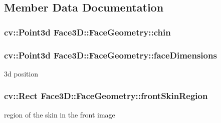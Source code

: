 \subsection{Member Data Documentation}
\subsubsection[{\texorpdfstring{chin}{chin}}]{\setlength{\rightskip}{0pt plus 5cm}cv\+::\+Point3d Face3\+D\+::\+Face\+Geometry\+::chin\hspace{0.3cm}{\ttfamily [private]}}\hypertarget{class_face3_d_1_1_face_geometry_a1c10c36a6624d30328d54b28f2829ac0}{}\label{class_face3_d_1_1_face_geometry_a1c10c36a6624d30328d54b28f2829ac0}
\subsubsection[{\texorpdfstring{face\+Dimensions}{faceDimensions}}]{\setlength{\rightskip}{0pt plus 5cm}cv\+::\+Point3d Face3\+D\+::\+Face\+Geometry\+::face\+Dimensions\hspace{0.3cm}{\ttfamily [private]}}\hypertarget{class_face3_d_1_1_face_geometry_a41a5f4561198a1296a9d37ad7f562c68}{}\label{class_face3_d_1_1_face_geometry_a41a5f4561198a1296a9d37ad7f562c68}


3d position 

\subsubsection[{\texorpdfstring{front\+Skin\+Region}{frontSkinRegion}}]{\setlength{\rightskip}{0pt plus 5cm}cv\+::\+Rect Face3\+D\+::\+Face\+Geometry\+::front\+Skin\+Region\hspace{0.3cm}{\ttfamily [private]}}\hypertarget{class_face3_d_1_1_face_geometry_aec3c5ac2a67745348df5aa68651bf616}{}\label{class_face3_d_1_1_face_geometry_aec3c5ac2a67745348df5aa68651bf616}


region of the skin in the front image 

